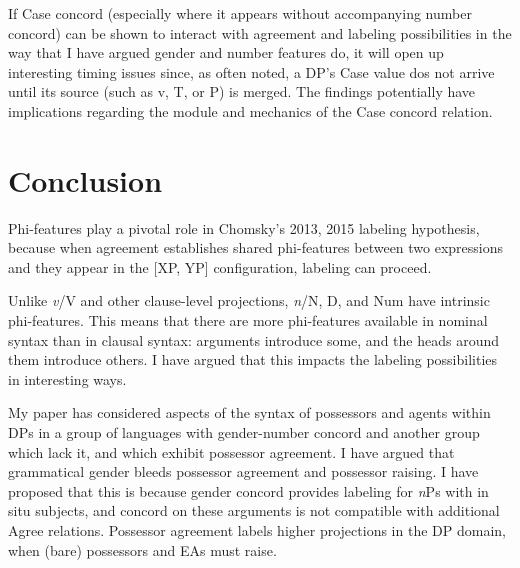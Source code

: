 \documentclass[output=paper
,modfonts
,nonflat]{langsci/langscibook}
\begin{document}
If Case concord (especially where it appears without accompanying number concord) can be shown to interact with agreement and labeling possibilities in the way that I have argued gender and number features do, it will open up interesting timing issues since, as often noted, a DP’s Case value dos not arrive until its source (such as v, T, or P) is merged. The findings potentially have implications regarding the module and mechanics of the Case concord relation.  

\section{Conclusion}

Phi-features play a pivotal role in Chomsky's 2013, 2015 labeling hypothesis, because when agreement establishes shared phi-features between two expressions and they appear in the [XP, YP] configuration, labeling can proceed. 

Unlike \textit{v}/V and other clause-level projections, \textit{n}/N, D, and Num have intrinsic phi-features. This means that there are more phi-features available in nominal syntax than in clausal syntax: arguments introduce some, and the heads around them introduce others. I have argued that this impacts the labeling possibilities in interesting ways.

My paper has considered aspects of the syntax of possessors and agents within DPs in a group of languages with gender-number concord and another group which lack it, and which exhibit possessor agreement. I have argued that grammatical gender bleeds possessor agreement and possessor raising. I have proposed that this is because gender concord provides labeling for \textit{n}Ps with in situ subjects, and concord on these arguments is not compatible with additional Agree relations. Possessor agreement labels higher projections in the DP domain, when (bare) possessors and EAs must raise.

\sloppy
\printbibliography[heading=subbibliography,notkeyword=this]
\end{document}

